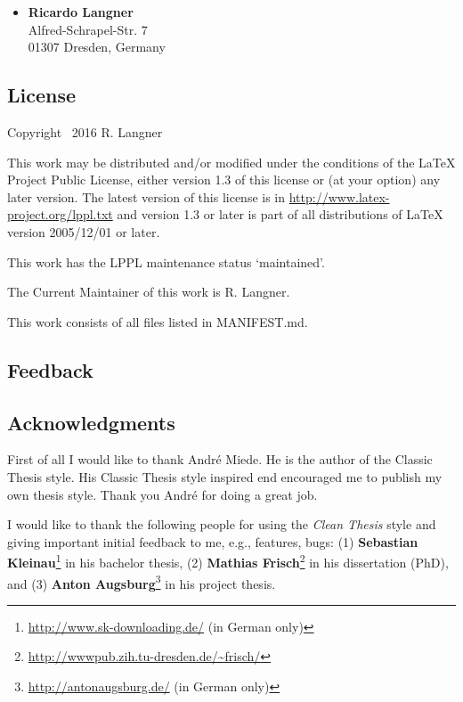\documentclass{ltxdockit}
\newcommand*{\cleanthesis}{\emph{Clean Thesis}\xspace}
\begin{document}
\begin{itemize}
\item \textbf{Ricardo Langner} \\
Alfred-Schrapel-Str. 7 \\
01307 Dresden, Germany
\end{itemize}

\subsection{License}
\label{sec:intro:license}

Copyright \textcopyright\ 2016 R. Langner

This work may be distributed and/or modified under the
conditions of the LaTeX Project Public License, either version 1.3
of this license or (at your option) any later version.
The latest version of this license is in
  \url{http://www.latex-project.org/lppl.txt}
and version 1.3 or later is part of all distributions of LaTeX
version 2005/12/01 or later.

This work has the LPPL maintenance status `maintained'.

The Current Maintainer of this work is R. Langner.

This work consists of all files listed in MANIFEST.md.

\subsection{Feedback}
\label{sec:intro:feedback}

\subsection{Acknowledgments}
\label{sec:intro:ack}

First of all I would like to thank André Miede. He is the author of the Classic Thesis style. His Classic Thesis style inspired end encouraged me to publish my own thesis style. Thank you André for doing a great job.

I would like to thank the following people for using the \cleanthesis style and giving important initial feedback to me, e.g., features, bugs: (1) \textbf{Sebastian Kleinau}\footnote{\url{http://www.sk-downloading.de/} (in German only)} in his bachelor thesis, (2) \textbf{Mathias Frisch}\footnote{\url{http://wwwpub.zih.tu-dresden.de/~frisch/}} in his dissertation (PhD), and (3) \textbf{Anton Augsburg}\footnote{\url{http://antonaugsburg.de/} (in German only)} in his project thesis.
\end{document}
